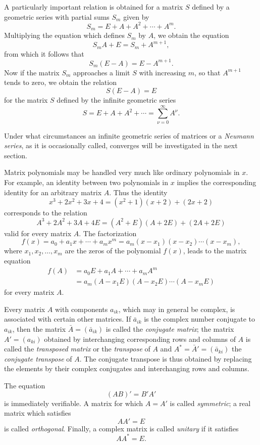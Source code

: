 A particularly important relation is obtained for a matrix $S$ defined by a geometric series with partial sums $S_m$ given by
\[
S_m=E+A+A^2+\cdots+A^m.
\]
Multiplying the equation which defines $S_m$ by $A$, we obtain the equation
\[
S_mA+E=S_m+A^{m+1},
\]
from which it follows that
\[
S_m(E-A)=E-A^{m+1}.
\]
Now if the matrix $S_m$ approaches a limit $S$ with increasing $m$, so that $A^{m+1}$ tends to zero, we obtain the relation
\[
S(E-A)=E
\]
for the matrix $S$ defined by the infinite geometric series
\[
S=E+A+A^2+\cdots=\sum_{\nu=0}^{\infty}A^\nu.
\]

Under what circumstances an infinite geometric series of matrices or a \emph{Neumann series}, as it is occasionally called, converges will be investigated in the next section.

Matrix polynomials may be handled very much like ordinary polynomials in $x$. For example, an identity between two polynomials in $x$ implies the corresponding identity for an arbitrary matrix $A$. Thus the identity
\[
x^3+2x^2+3x+4=(x^2+1)(x+2)+(2x+2)
\]
corresponds to the relation
\[
A^3+2A^2+3A+4E=(A^2+E)(A+2E)+(2A+2E)
\]
valid for every matrix $A$. The factorization
\[
f(x)=a_0+a_1x+\cdots+a_mx^m=a_m(x-x_1)(x-x_2)\cdots(x-x_m),
\]
where $x_1,x_2,\ldots,x_m$ are the zeros of the polynomial $f(x)$, leads to the matrix equation
\[
\begin{aligned}
f(A)&=a_0E+a_1A+\cdots+a_mA^m\\
&=a_m(A-x_1E)(A-x_2E)\cdots(A-x_mE)
\end{aligned}
\]
for every matrix $A$.

Every matrix $A$ with components $a_{ik}$, which may in general be complex, is associated with certain other matrices. If $\bar a_{ik}$ is the complex number conjugate to $a_{ik}$, then the matrix $\bar A=(\bar a_{ik})$ is called the \emph{conjugate matrix}; the matrix $A'=(a_{ki})$ obtained by interchanging corresponding rows and columns of $A$ is called the \emph{transposed matrix} or the \emph{transpose} of $A$ and $A^*=\bar A'=(\bar a_{ki})$ the \emph{conjugate transpose} of $A$. The conjugate transpose is thus obtained by replacing the elements by their complex conjugates and interchanging rows and columns.

The equation
\[
(AB)'=B'A'
\]
is immediately verifiable. A matrix for which $A=A'$ is called \emph{symmetric}; a real matrix which satisfies
\[
AA'=E
\]
is called \emph{orthogonal}. Finally, a complex matrix is called \emph{unitary} if it satisfies
\[
AA^*=E.
\]

